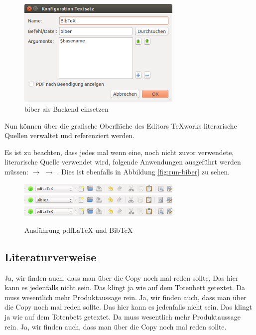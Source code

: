 \begin{figure}
	\centering
	\includegraphics[width=0.7\textwidth]{bilder/konfiguration-biber-02.png}
	\caption{biber als Backend einsetzen}
	\label{fig:konfiguration-biber-02}
\end{figure}

Nun können über die grafische Oberfläche des Editors TeXworks literarische Quellen verwaltet und referenziert werden.

Es ist zu beachten, dass jedes mal wenn eine, noch nicht zuvor verwendete, literarische Quelle verwendet wird, folgende Anwendungen ausgeführt werden müssen:  $\rightarrow$  $\rightarrow$ . Dies ist ebenfalls in Abbildung \vref{fig:run-biber} zu sehen.

\begin{figure}
	\centering
	\includegraphics[width=0.7\textwidth]{bilder/run-biber-01.png}
	\includegraphics[width=0.7\textwidth]{bilder/run-biber-02.png}
	\includegraphics[width=0.7\textwidth]{bilder/run-biber-01.png}
	\caption{Ausführung pdfLaTeX und BibTeX}
	\label{fig:run-biber}
\end{figure}


\subsection{Literaturverweise}

Ja, wir finden auch, dass man über die Copy noch mal reden sollte. Das hier kann es jedenfalls nicht sein. Das klingt ja wie auf dem Totenbett getextet. Da muss wesentlich mehr Produktaussage rein. Ja, wir finden auch, dass man über die Copy noch mal reden sollte. Das hier kann es jedenfalls nicht sein. Das klingt ja wie auf dem Totenbett getextet. Da muss wesentlich mehr Produktaussage rein. Ja, wir finden auch, dass man über die Copy noch mal reden sollte. \cite{angenendt}

